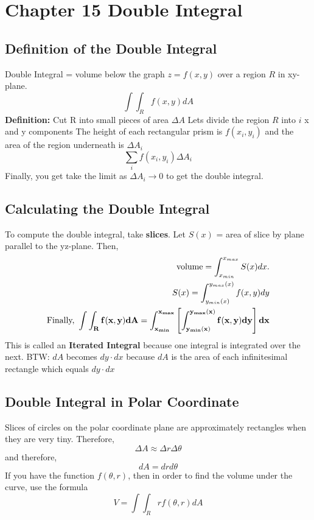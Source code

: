 \documentclass[../main.tex]{subfiles}
\begin{document}
\section{Chapter 15 Double Integral}

\subsection{Definition of the Double Integral}
Double Integral = volume below the graph $z = f(x,y)$ over a region $R$ in xy-plane.
\begin{equation*}
	\int \int_R f(x,y)dA
\end{equation*}
\textbf{Definition: } Cut R into small pieces of area $\Delta A$
Lets divide the region $R$ into $i$ x and y components
The height of each rectangular prism is $f(x_i, y_i)$ and the area of the region underneath is $\Delta A_i$
\begin{equation*}
	\sum_i f(x_i,y_i) \Delta A_i 
\end{equation*}
Finally, you get take the limit as $\Delta A_i \to 0$ to get the double integral.

\subsection{Calculating the Double Integral}
To compute the double integral, take \textbf{slices}. 
Let $S(x)$ = area of slice by plane parallel to the yz-plane.
Then, 
\begin{align*}
	\text{volume} = \int_{x_{min}}^{x_{max}} S(x)dx. \\
	S(x) = \int_{y_{min}(x)}^{y_{max}(x)} f(x,y)dy \\
	{\bf \text{Finally, } \int \int_R f(x,y) dA = \int_{x_{min}}^{x_{max}} \left[ \int_{y_{min}(x)}^{y_{max}(x)} f(x,y) dy \right] dx}
\end{align*}
This is called an \textbf{Iterated Integral} because one integral is integrated over the next.
BTW: $dA$ becomes $dy \cdot dx$ because $dA$ is the area of each infinitesimal rectangle which equals $dy \cdot dx$

\subsection{Double Integral in Polar Coordinate}
Slices of circles on the polar coordinate plane are approximately rectangles when they are very tiny. Therefore,
\begin{equation*}
	\Delta A \approx \Delta r \Delta \theta
\end{equation*}
and therefore, 
\begin{equation*}
	dA = dr d\theta
\end{equation*}
If you have the function $f(\theta,r)$, then in order to find the volume under the curve, use the formula
\begin{equation*}
	V = \int \int_R rf(\theta,r) dA
\end{equation*}
\end{document}
